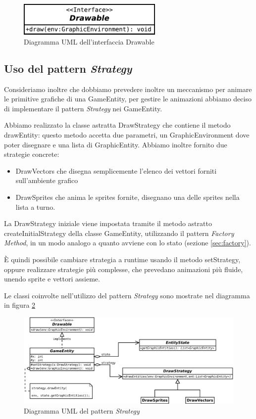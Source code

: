 \documentclass[a4paper,12pt]{article}
\begin{document}
\begin{figure}[ht]
\centering
\includegraphics[width=7cm]{Drawable.pdf}
\caption{Diagramma UML dell'interfaccia \textsf{Drawable}}
\label{img:Drawable}
\end{figure}

\subsection{Uso del pattern \emph{Strategy}}

Consideriamo inoltre che dobbiamo prevedere inoltre un meccanismo per animare le primitive grafiche di una \textsf{GameEntity}, per gestire le animazioni abbiamo deciso di implementare il pattern \emph{Strategy} nei \textsf{GameEntity}.

Abbiamo realizzato la classe astratta \textsf{DrawStrategy} che contiene il metodo \textsf{drawEntity}: questo metodo accetta due parametri, un \textsf{GraphicEnvironment} dove poter disegnare e una lista di \textsf{GraphicEntity}. Abbiamo inoltre fornito due strategie concrete:

\begin{itemize}
\item \textsf{DrawVectors} che disegna semplicemente l'elenco dei vettori forniti sull'ambiente grafico
\item \textsf{DrawSprites} che anima le sprites fornite, disegnano una delle sprites nella lista a turno.
\end{itemize}

La \textsf{DrawStrategy} iniziale viene impostata tramite il metodo astratto \textsf{createInitialStrategy} della classe \textsf{GameEntity}, utilizzando il pattern \emph{Factory Method}, in un modo analogo a quanto avviene con lo stato (sezione \ref{sec:factory}).

\`E quindi possibile cambiare strategia a runtime usando il metodo \textsf{setStrategy}, oppure realizzare strategie pi\`u complesse, che prevedano animazioni pi\`u fluide, unendo sprite e vettori assieme.

Le classi coinvolte nell'utilizzo del pattern \emph{Strategy} sono mostrate nel diagramma in figura \ref{img:Strategy}

\begin{figure}[ht]
\centering
\includegraphics[width=14cm]{Strategy.pdf}
\caption{Diagramma UML del pattern \emph{Strategy}}
\label{img:Strategy}
\end{figure}
\end{document}
